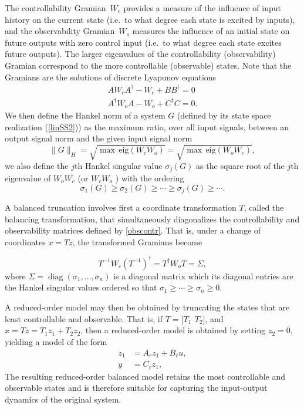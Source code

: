 \documentclass[12pt,lot, lof]{puthesis}
\begin{document}
 The controllability Gramian~$W_c$ provides a measure of the influence of input history on the current state (i.e.\ to what degree each state is excited by inputs), and the observability  Gramian~$W_o$ measures the influence of an initial state on future outputs with zero control input (i.e.\ to what degree each state excites future outputs). The larger eigenvalues of the controllability (observability) Gramian correspond to the more controllable (observable) states.
 Note that the Gramians are the solutions of discrete Lyapunov equations
 \begin{subequations}
\begin{align}
A W_c A^{\dagger} - W_c  + B B^{\dagger}= 0 \\
A^{\dagger} W_o A- W_o  + C^{\dagger} C= 0. 
\end{align}
\label{obscontr22}
\end{subequations}
We then define the Hankel norm of a system $G$ (defined by its state space realization (\ref{linSS2})) as the maximum ratio, over all input signals, between an output signal norm and the given input signal norm
\begin{equation}
\| G \|_H = \sqrt{ \max \, \text{eig}(W_c W_o) } = \sqrt{ \max \, \text{eig}(W_o W_c) },
\end{equation}
we also define the $j$th Hankel singular value $\sigma_j (G)$ as the square root of the $j$th eigenvalue of $W_o W_c$ (or $W_c W_o$ ) with the ordering
\[
	\sigma_1(G) \ge   \sigma_2(G) \ge \cdots \ge \sigma_j (G) \ge \cdots.
\]


A balanced truncation involves first a coordinate transformation $T$, called the balancing transformation, that simultaneously diagonalizes the controllability and observability matrices defined by \eqref{obscontr}.  That is, under a change of coordinates $x=Tz$, the transformed Gramians become

\begin{equation}
T^{-1} W_c ( T^{-1} )^\dagger = T^{\dagger} W_o  T = \Sigma,
\end{equation}
where $\Sigma = \operatorname{diag}(\sigma_1,\ldots,\sigma_n)$ is a diagonal matrix which its diagonal entries are the Hankel singular values ordered so that $\sigma_1 \ge \cdots \ge \sigma_n \ge 0$.

A reduced-order model may then be obtained by truncating the states that are least controllable and observable.  That is, if $T = \bigl[ T_1\ \,T_2 \bigr]$, and $x = Tz = T_1 z_1 + T_2 z_2$, then a reduced-order model is obtained by setting $z_2=0$, yielding a model of the form
\begin{equation}
\label{redz2}
\begin{aligned}
	\dot{z}_1 &= A_r z_1  + B_r u,   \\
	y &= C_r z_1 ,
\end{aligned}
\end{equation}
The resulting reduced-order balanced model retains the most controllable and observable states and is therefore suitable for capturing the input-output dynamics of the original system.
\end{document}
